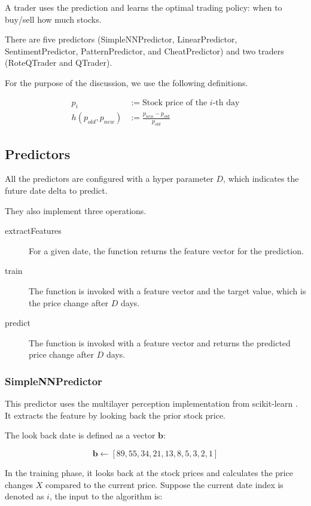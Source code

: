 \documentclass[twocolumn,10pt]{asme2ej}
\newcommand{\vect}[1]{\boldsymbol{#1}}
\begin{document}
A trader uses the prediction and learns the optimal trading policy:
when to buy/sell how much stocks.

There are five predictors (SimpleNNPredictor, LinearPredictor,
SentimentPredictor, PatternPredictor, and CheatPredictor) and two
traders (RoteQTrader and QTrader). 

For the purpose of the discussion, we use the following definitions.

\begin{align*}
p_i &:= \text{Stock price of the }i\text{-th day} \\
h(p_{old}, p_{new}) &:= \frac{p_{new} - p_{old}}{p_{old}}
\end{align*}

\subsection{Predictors}

All the predictors are configured with a hyper parameter $D$, which indicates
the future date delta to predict. 

They also implement three operations.

\begin{description}
  \item[extractFeatures] For a given date, the function returns the feature
    vector for the prediction.
  \item[train] The function is invoked with a feature vector and the target
    value, which is the price change after $D$ days.
  \item[predict] The function is invoked with a feature vector and returns the
    predicted price change after $D$ days.
\end{description}

\subsubsection{SimpleNNPredictor}
This predictor uses the multilayer perception implementation from
scikit-learn \cite{web:scikit_learn}. It extracts the feature by
looking back the prior stock price.

The look back date is defined as a vector $\vect{b}$:

\[
\vect{b} \gets [89, 55, 34, 21, 13, 8, 5, 3, 2, 1]
\]

In the training phase, it looks back at the stock prices and calculates
the price changes $X$ compared to the current price. Suppose the
current date index is denoted as $i$, the input to the algorithm is:
\end{document}
